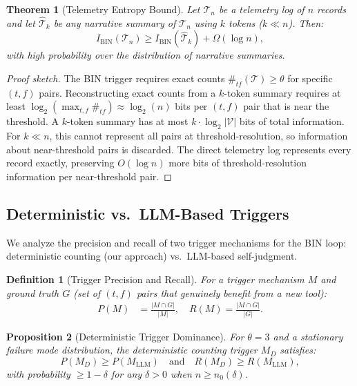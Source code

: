 \documentclass[11pt]{article}
\newtheorem{theorem}{Theorem}
\newtheorem{proposition}[theorem]{Proposition}
\newtheorem{definition}{Definition}
\begin{document}
\begin{theorem}[Telemetry Entropy Bound]
\label{thm:entropy}
Let $\mathcal{T}_n$ be a telemetry log of $n$ records and let $\hat{\mathcal{T}}_k$ be
any narrative summary of $\mathcal{T}_n$ using $k$ tokens ($k \ll n$). Then:
\begin{equation}
I_{\text{BIN}}(\mathcal{T}_n) \geq I_{\text{BIN}}(\hat{\mathcal{T}}_k) + \Omega\!\left(\log n\right),
\end{equation}
with high probability over the distribution of narrative summaries.
\end{theorem}

\begin{proof}[Proof sketch]
The BIN trigger requires exact counts $\#_{tf}(\mathcal{T}) \geq \theta$ for
specific $(t,f)$ pairs. Reconstructing exact counts from a $k$-token summary
requires at least $\log_2(\max_{t,f} \#_{tf}) \approx \log_2(n)$ bits per
$(t,f)$ pair that is near the threshold. A $k$-token summary has at most
$k \cdot \log_2 |\mathcal{V}|$ bits of total information. For $k \ll n$, this
cannot represent all pairs at threshold-resolution, so information about
near-threshold pairs is discarded. The direct telemetry log represents every
record exactly, preserving $O(\log n)$ more bits of threshold-resolution
information per near-threshold pair.
\end{proof}

\subsection{Deterministic vs.\ LLM-Based Triggers}
\label{sec:triggers}

We analyze the precision and recall of two trigger mechanisms for the BIN loop:
deterministic counting (our approach) vs.\ LLM-based self-judgment.

\begin{definition}[Trigger Precision and Recall]
\label{def:precision_recall}
For a trigger mechanism $M$ and ground truth $G$ (set of $(t,f)$ pairs that
genuinely benefit from a new tool):
\begin{align}
P(M) &= \frac{|M \cap G|}{|M|}, \quad R(M) = \frac{|M \cap G|}{|G|}.
\end{align}
\end{definition}

\begin{proposition}[Deterministic Trigger Dominance]
\label{prop:trigger_dominance}
For $\theta = 3$ and a stationary failure mode distribution, the deterministic
counting trigger $M_D$ satisfies:
\begin{equation}
P(M_D) \geq P(M_{\text{LLM}}) \quad \text{and} \quad R(M_D) \geq R(M_{\text{LLM}}),
\end{equation}
with probability $\geq 1 - \delta$ for any $\delta > 0$ when $n \geq n_0(\delta)$.
\end{proposition}
\end{document}
